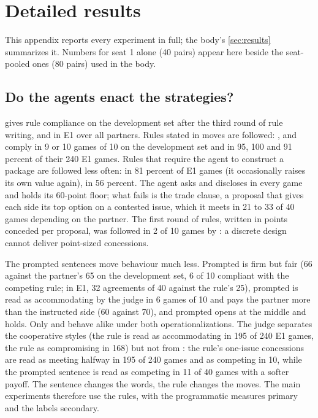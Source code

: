 \section{Detailed results}
\label{app:results}
This appendix reports every experiment in full; the body's \cref{sec:results} summarizes it. Numbers for seat 1 alone (40 pairs) appear here beside the seat-pooled ones (80 pairs) used in the body.

\subsection{Do the agents enact the strategies?}
\label{sec:e0}
 gives rule compliance on the development set after the third round of rule writing, and in E1 over all partners. Rules stated in moves are followed: \competing, \avoiding{} and \accommodating{} comply in 9 or 10 games of 10 on the development set and in 95, 100 and 91 percent of their 240 E1 games. Rules that require the agent to construct a package are followed less often: \compromising{} in 81 percent of E1 games (it occasionally raises its own value again), \collaborating{} in 56 percent. The \collaborating{} agent asks and discloses in every game and holds its 60-point floor; what fails is the trade clause, a proposal that gives each side its top option on a contested issue, which it meets in 21 to 33 of 40 games depending on the partner. The first round of rules, written in points conceded per proposal, was followed in 2 of 10 games by \competing: a discrete design cannot deliver point-sized concessions.

The prompted sentences move behaviour much less. Prompted \competing{} is firm but fair (66 against the partner's 65 on the development set, 6 of 10 compliant with the competing rule; in E1, 32 agreements of 40 against the rule's 25), prompted \collaborating{} is read as accommodating by the judge in 6 games of 10 and pays the partner more than the instructed side (60 against 70), and prompted \compromising{} opens at the middle and holds. Only \accommodating{} and \avoiding{} behave alike under both operationalizations. The judge separates the cooperative styles (the \accommodating{} rule is read as accommodating in 195 of 240 E1 games, the \compromising{} rule as compromising in 168) but not \competing{} from \compromising{}: the \competing{} rule's one-issue concessions are read as meeting halfway in 195 of 240 games and as competing in 10, while the prompted \competing{} sentence is read as competing in 11 of 40 games with a softer payoff. The sentence changes the words, the rule changes the moves. The main experiments therefore use the rules, with the programmatic measures primary and the labels secondary.


